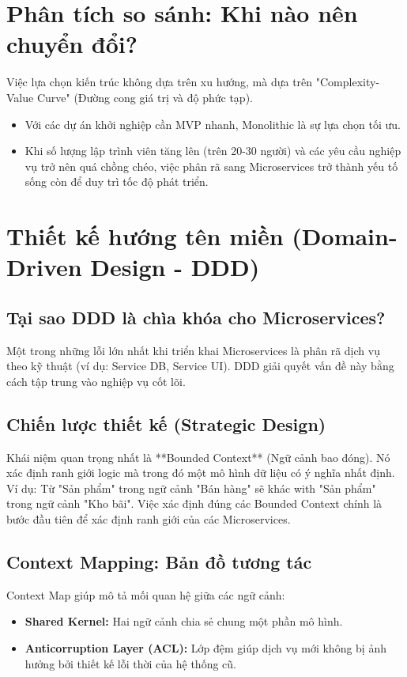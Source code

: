 \documentclass[12pt,a4paper]{report}
\begin{document}
\section{Phân tích so sánh: Khi nào nên chuyển đổi?}
Việc lựa chọn kiến trúc không dựa trên xu hướng, mà dựa trên "Complexity-Value Curve" (Đường cong giá trị và độ phức tạp). 
\begin{itemize}
    \item Với các dự án khởi nghiệp cần MVP nhanh, Monolithic là sự lựa chọn tối ưu. 
    \item Khi số lượng lập trình viên tăng lên (trên 20-30 người) và các yêu cầu nghiệp vụ trở nên quá chồng chéo, việc phân rã sang Microservices trở thành yếu tố sống còn để duy trì tốc độ phát triển.
\end{itemize}

\section{Thiết kế hướng tên miền (Domain-Driven Design - DDD)}
\subsection{Tại sao DDD là chìa khóa cho Microservices?}
Một trong những lỗi lớn nhất khi triển khai Microservices là phân rã dịch vụ theo kỹ thuật (ví dụ: Service DB, Service UI). DDD giải quyết vấn đề này bằng cách tập trung vào nghiệp vụ cốt lõi.

\subsection{Chiến lược thiết kế (Strategic Design)}
Khái niệm quan trọng nhất là **Bounded Context** (Ngữ cảnh bao đóng). Nó xác định ranh giới logic mà trong đó một mô hình dữ liệu có ý nghĩa nhất định. Ví dụ: Từ "Sản phẩm" trong ngữ cảnh "Bán hàng" sẽ khác with "Sản phẩm" trong ngữ cảnh "Kho bãi". Việc xác định đúng các Bounded Context chính là bước đầu tiên để xác định ranh giới của các Microservices.

\subsection{Context Mapping: Bản đồ tương tác}
Context Map giúp mô tả mối quan hệ giữa các ngữ cảnh:
\begin{itemize}
    \item \textbf{Shared Kernel:} Hai ngữ cảnh chia sẻ chung một phần mô hình.
    \item \textbf{Anticorruption Layer (ACL):} Lớp đệm giúp dịch vụ mới không bị ảnh hưởng bởi thiết kế lỗi thời của hệ thống cũ.
\end{itemize}
\end{document}
